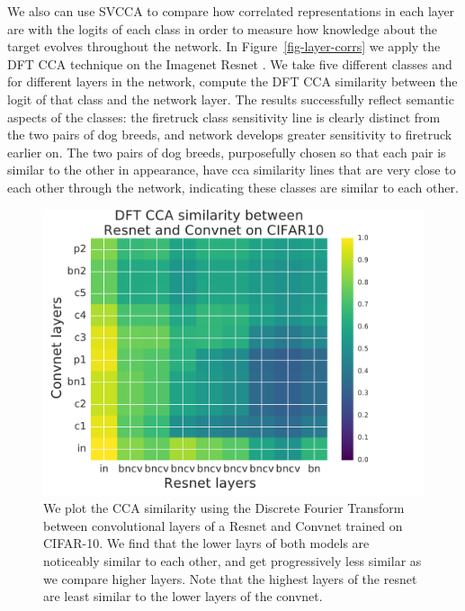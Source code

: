 \documentclass{article} %
\begin{document}
\label{sec:class_svcca}
    We also can use SVCCA to compare how correlated representations in each layer are with the logits of each class in order to measure how knowledge about the target evolves throughout the network. In Figure~\ref{fig-layer-corrs} we apply the DFT CCA technique on the Imagenet Resnet \cite{resnet2015he}. We take five different classes and for different layers in the network, compute the DFT CCA similarity between the logit of that class and the network layer. The results successfully reflect semantic aspects of the classes: the firetruck class sensitivity line is clearly distinct from the two pairs of dog breeds, and network develops greater sensitivity to firetruck earlier on. The two pairs of dog breeds, purposefully chosen so that each pair is similar to the other in appearance, have cca similarity lines that are very close to each other through the network, indicating these classes are similar to each other.

\begin{figure}
   \centering
   \includegraphics[scale=0.35]{camera_ready_plots/conv_resnet.pdf}
   \caption{\small We plot the CCA similarity using the Discrete Fourier Transform between convolutional layers of a Resnet and Convnet trained on CIFAR-10. We find that the lower layrs of both models are noticeably similar to each other, and get progressively less similar as we compare higher layers. Note that the highest layers of the resnet are least similar to the lower layers of the convnet.}
   \label{fig-diff-architectures}
   \centering   
 \end{figure}
\end{document}
